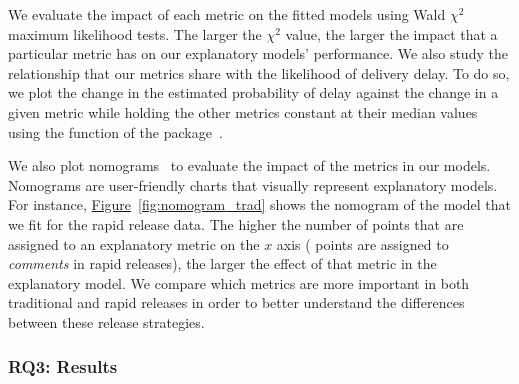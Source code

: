 We evaluate the impact of each metric on the fitted models using
Wald $\chi^2$ maximum likelihood tests. The larger the $\chi^2$ value, the
larger the impact that a particular metric has on our explanatory models'
performance. We also study the relationship that our metrics 
share with the likelihood of delivery delay. To do so, we plot the change in
the estimated probability of delay against the change in a given metric
while holding the other metrics constant at their median values using the
 function of the  package~\cite{harrell2001regression}. 

We also plot nomograms~\cite{iasonos2008build,harrell2001regression} to evaluate
the impact of the metrics in our models. Nomograms are user-friendly charts that
visually represent explanatory models. For instance,
\hyperref[fig:nomogram_trad]{Figure}~\ref{fig:nomogram_trad} shows the nomogram
of the model that we fit for the rapid release data. The higher the number of
points that are assigned to an explanatory metric on the $x$ axis (
points are assigned to \textit{comments} in rapid releases), the larger the
effect of that metric in the explanatory model. We compare which metrics are
more important in both traditional and rapid releases in order to better
understand the differences between these release strategies.

\subsubsection*{RQ3: Results}

